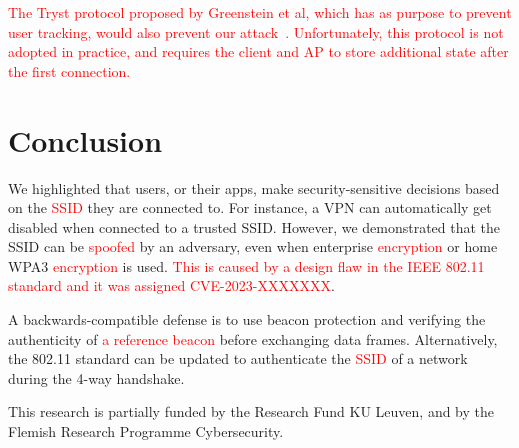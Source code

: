\documentclass[sigconf,review]{acmart}
\newcommand{\fourway}{\mbox{4-way}}
\DeclareRobustCommand{\red}[1]{\textcolor{red}{#1}}
\begin{document}
\red{The Tryst protocol proposed by Greenstein et al, which has as purpose to prevent user tracking, would also prevent our attack~\cite{greenstein2008improving}.
Unfortunately, this protocol is not adopted in practice, and requires the client and AP to store additional state after the first connection.}

\section{Conclusion}
\label{sec:conclusion}

We highlighted that users, or their apps, make security-sensitive decisions based on the \red{SSID} they are connected to.
For instance, a VPN can automatically get disabled when connected to a trusted SSID. 
However, we demonstrated that the SSID can be \red{spoofed} by an adversary, even when enterprise \red{encryption} or home WPA3 \red{encryption} is used.
\red{This is caused by a design flaw in the IEEE 802.11 standard and it was assigned CVE-2023-XXXXXXX}.

A backwards-compatible defense is to use beacon protection and verifying the authenticity of \red{a reference beacon} before exchanging data frames.
Alternatively, the 802.11 standard can be updated to authenticate the \red{SSID} of a network during the \fourway{} handshake.

\begin{acks}
This research is partially funded by the Research Fund KU Leuven, and by the Flemish Research Programme Cybersecurity.
\end{acks}




\end{document}
